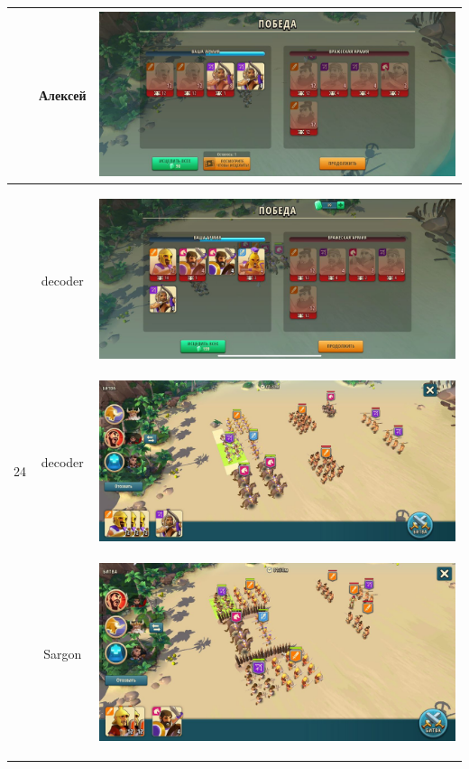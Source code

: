 \begin{longtable}{|c|c|c|}
	& Алексей &
	\includegraphics[width=0.75\linewidth]{./parts/media/TreasureHunt/24/alexey/photo_2022-04-13_19-01-59.jpg} \\
	\hline
	\multirow{6}{*}{24} & decoder &
	\hypertarget{fight24}{\includegraphics[width=0.75\linewidth]{./parts/media/TreasureHunt/24/decoder/photo_2022-04-06_18-10-13.jpg}} \\
	& decoder &
	\includegraphics[width=0.75\linewidth]{./parts/media/TreasureHunt/24/decoder/photo_2022-04-06_18-10-02.jpg} \\
	\hline
	\multirow{14}{*}{25} & Sargon &
	\hypertarget{fight25}{\includegraphics[width=0.75\linewidth]{./parts/media/TreasureHunt/25/sargon/photo_2022-04-07_09-58-16.jpg}} \\

\end{longtable}
